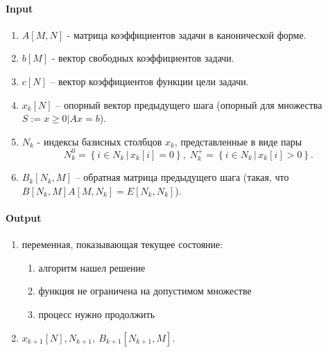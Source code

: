 \documentclass{article}
\begin{document}
\paragraph*{Input}
\begin{enumerate}
    \item $A\left[M, N\right]$ - матрица коэффициентов задачи в канонической форме.
    \item $b\left[M\right]$ - вектор свободных коэффициентов задачи.
    \item $c\left[N\right]$ – вектор коэффициентов функции цели задачи.
    \item $x_k\left[N\right]$ – опорный вектор предыдущего шага (опорный для множества $S:={x\geq0|Ax=b}$).
    \item $N_k$ - индексы базисных столбцов $x_k$, представленные в виде пары
\begin{equation*}
N_k^0 = \left\{i\in N_k\,|\,x_k[i]=0\right\},\;N_k^+ = \left\{i\in N_k\,|\,x_k[i]>0\right\}.
\end{equation*}
    \item $B_k\left[N_k,M\right]$ – обратная матрица предыдущего шага (такая, что $B\left[N_k,M\right] A\left[M,N_k\right]=E[N_k,N_k]$).
\end{enumerate}
\paragraph*{Output}
\begin{enumerate}
    \item {переменная, показывающая текущее состояние:
\begin{enumerate}
    \item алгоритм нашел решение
    \item функция не ограничена на допустимом множестве
    \item процесс нужно продолжить
\end{enumerate}
}
\item $x_{k+1}[N], N_{k+1},\ B_{k+1}\left[N_{k+1},M\right]$.
\end{enumerate}
\end{document}
